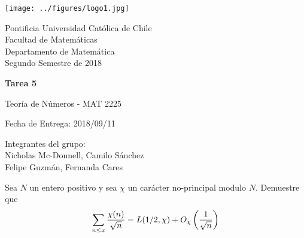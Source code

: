 


\begin{minipage}{2.5cm}
	\texttt{[image: ../figures/logo1.jpg]}
\end{minipage}
\begin{minipage}{13cm}
	\begin{flushleft}
		\raggedright
		{
			\noindent
			{\sc Pontificia Universidad Católica de Chile\\
				Facultad de Matemáticas\\
				Departamento de Matemática} \smallskip \\
			Segundo Semestre de 2018\\
		}
	\end{flushleft}
\end{minipage}

\vspace{2ex}
{\Large \centerline{\bf Tarea 5}}
{\large \centerline{Teoría de Números - MAT 2225}}
\centerline{Fecha de Entrega: 2018/09/11}

\begin{flushright}
	Integrantes del grupo:\\
	Nicholas Mc-Donnell, Camilo Sánchez\\
	Felipe Guzmán, Fernanda Cares
\end{flushright}

\begin{prob}[6 pts.]
	Sea $N$ un entero positivo y sea $\chi$ un carácter no-principal modulo $N$. Demuestre que
	\[\sum_{n\leq x}\frac{\chi(n)}{\sqrt{n}}=L(1/2,\chi)+O_\chi\left(\frac1{\sqrt{n}}\right)\]
\end{prob}

